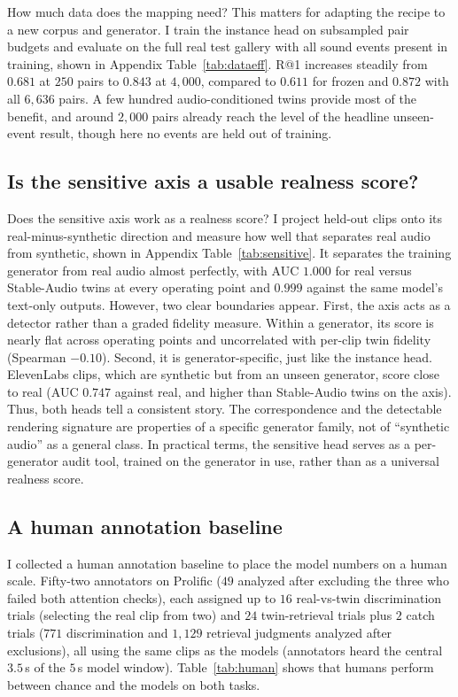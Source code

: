 \documentclass{article}
\begin{document}
How much data does the mapping need? This matters for adapting the recipe to a new corpus and generator. I train the instance head on subsampled pair budgets and evaluate on the full real test gallery with all sound events present in training, shown in Appendix Table~\ref{tab:dataeff}. R@1 increases steadily from $0.681$ at $250$ pairs to $0.843$ at $4{,}000$, compared to $0.611$ for frozen and $0.872$ with all $6{,}636$ pairs. A few hundred audio-conditioned twins provide most of the benefit, and around $2{,}000$ pairs already reach the level of the headline unseen-event result, though here no events are held out of training.

\subsection{Is the sensitive axis a usable realness score?}
\label{sec:sensval}
Does the sensitive axis work as a realness score? I project held-out clips onto its real-minus-synthetic direction and measure how well that separates real audio from synthetic, shown in Appendix Table~\ref{tab:sensitive}. It separates the training generator from real audio almost perfectly, with AUC $1.000$ for real versus Stable-Audio twins at every operating point and $0.999$ against the same model's text-only outputs. However, two clear boundaries appear. First, the axis acts as a detector rather than a graded fidelity measure. Within a generator, its score is nearly flat across operating points and uncorrelated with per-clip twin fidelity (Spearman $-0.10$). Second, it is generator-specific, just like the instance head. ElevenLabs clips, which are synthetic but from an unseen generator, score close to real (AUC $0.747$ against real, and higher than Stable-Audio twins on the axis). Thus, both heads tell a consistent story. The correspondence and the detectable rendering signature are properties of a specific generator family, not of ``synthetic audio'' as a general class. In practical terms, the sensitive head serves as a per-generator audit tool, trained on the generator in use, rather than as a universal realness score.

\subsection{A human annotation baseline}
\label{sec:human}
I collected a human annotation baseline to place the model numbers on a human scale. Fifty-two annotators on Prolific ($49$ analyzed after excluding the three who failed both attention checks), each assigned up to $16$ real-vs-twin discrimination trials (selecting the real clip from two) and $24$ twin-retrieval trials plus $2$ catch trials ($771$ discrimination and $1{,}129$ retrieval judgments analyzed after exclusions), all using the same clips as the models (annotators heard the central $3.5$\,s of the $5$\,s model window). Table~\ref{tab:human} shows that humans perform between chance and the models on both tasks.
\end{document}
